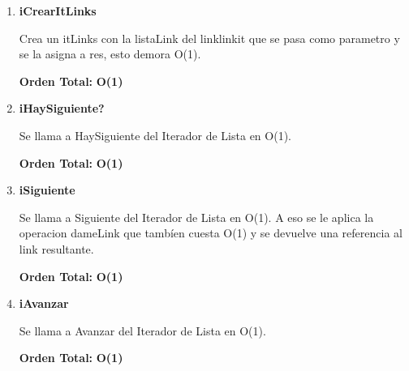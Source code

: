 \vspace*{1em}
\begin{enumerate}

\item\textbf{iCrearItLinks}
\par Crea un itLinks con la listaLink del linklinkit que se pasa como parametro y se la asigna a res, esto demora O(1).
\par \textbf{Orden Total:} \textbf{O(1)}

\item\textbf{iHaySiguiente?}
\par Se llama a HaySiguiente del Iterador de Lista en O(1).
\par \textbf{Orden Total:} \textbf{O(1)}

\item\textbf{iSiguiente}
\par Se llama a Siguiente del Iterador de Lista en O(1). A eso se le aplica la operacion dameLink que tambíen cuesta O(1) y se devuelve una referencia al link resultante.
\par \textbf{Orden Total:} \textbf{O(1)}

\item\textbf{iAvanzar}
\par Se llama a Avanzar del Iterador de Lista en O(1).
\par \textbf{Orden Total:} \textbf{O(1)}

\end{enumerate}